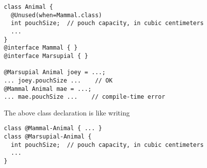 \begin{Verbatim}
class Animal {
  @Unused(when=Mammal.class)
  int pouchSize;  // pouch capacity, in cubic centimeters
  ...
}
@interface Mammal { }
@interface Marsupial { }

@Marsupial Animal joey = ...;
... joey.pouchSize ...    // OK
@Mammal Animal mae = ...;
... mae.pouchSize ...    // compile-time error
\end{Verbatim}

The above class declaration is like writing

\begin{Verbatim}
class @Mammal-Animal { ... }
class @Marsupial-Animal {
  int pouchSize;  // pouch capacity, in cubic centimeters
  ...
}
\end{Verbatim}


%
%
%
%
%
%
